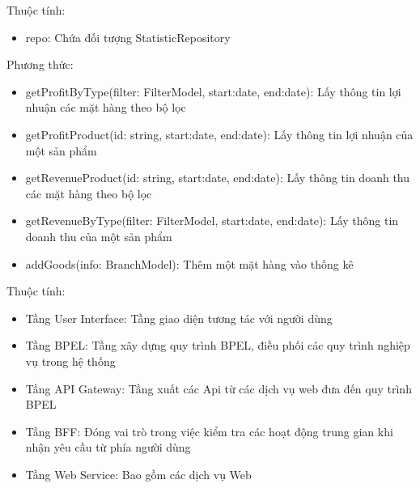 Thuộc tính:
\begin{itemize}
	\item repo: Chứa đối tượng StatisticRepository
\end{itemize}
Phương thức:
\begin{itemize}
	\item getProfitByType(filter: FilterModel, start:date,
	      end:date): Lấy thông tin lợi nhuận các mặt hàng theo bộ lọc
	\item getProfitProduct(id: string, start:date,
	      end:date): Lấy thông tin lợi nhuận của một sản phẩm
	\item getRevenueProduct(id: string, start:date,
	      end:date): Lấy thông tin doanh thu các mặt hàng theo bộ lọc
	\item getRevenueByType(filter: FilterModel, start:date,
	      end:date): Lấy thông tin doanh thu của một sản phẩm
	\item addGoods(info: BranchModel): Thêm một mặt hàng vào thống kê
\end{itemize}

Thuộc tính:
\begin{itemize}
	\item Tầng User Interface: Tầng giao diện tương tác với người dùng
	\item Tầng BPEL: Tầng xây dựng quy trình BPEL, điều phối các quy trình nghiệp vụ trong hệ thống
	\item Tầng API Gateway: Tầng xuất các Api từ các dịch vụ web đưa đến quy trình BPEL
	\item Tầng BFF: Đóng vai trò trong việc kiểm tra các hoạt động trung gian khi nhận yêu cầu từ phía người dùng
	\item Tầng Web Service: Bao gồm các dịch vụ Web
\end{itemize}

